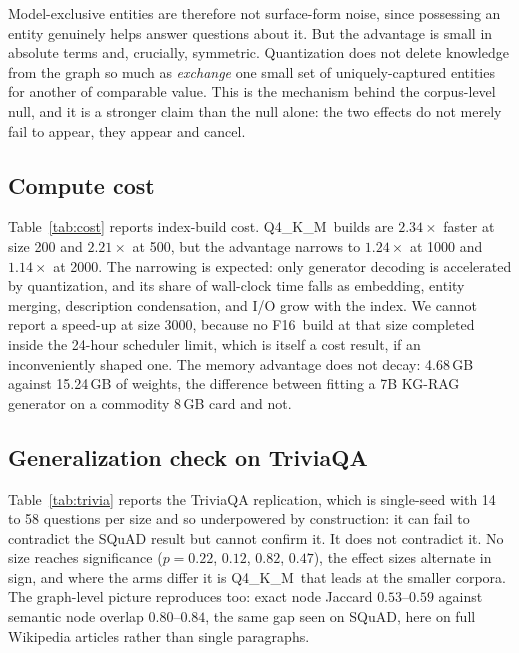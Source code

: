 \documentclass[conference, table]{IEEEtran}
\newcommand{\fsixteen}{F16}
\newcommand{\qfour}{Q4\_K\_M}
\begin{document}
\noindent
Model-exclusive entities are therefore not surface-form noise, since possessing an entity genuinely helps answer questions about it. But the advantage is small in absolute terms and, crucially, symmetric. Quantization does not delete knowledge from the graph so much as \emph{exchange} one small set of uniquely-captured entities for another of comparable value. This is the mechanism behind the corpus-level null, and it is a stronger claim than the null alone: the two effects do not merely fail to appear, they appear and cancel.



\subsection{Compute cost}

\noindent
Table~\ref{tab:cost} reports index-build cost. \qfour\ builds are $2.34\times$ faster at size 200 and $2.21\times$ at 500, but the advantage narrows to $1.24\times$ at 1000 and $1.14\times$ at 2000. The narrowing is expected: only generator decoding is accelerated by quantization, and its share of wall-clock time falls as embedding, entity merging, description condensation, and I/O grow with the index. We cannot report a speed-up at size 3000, because no \fsixteen\ build at that size completed inside the 24-hour scheduler limit, which is itself a cost result, if an inconveniently shaped one. The memory advantage does not decay: 4.68\,GB against 15.24\,GB of weights, the difference between fitting a 7B KG-RAG generator on a commodity 8\,GB card and not.



\subsection{Generalization check on TriviaQA}\label{sec:trivia}

\noindent
Table~\ref{tab:trivia} reports the TriviaQA replication, which is single-seed with 14 to 58 questions per size and so underpowered by construction: it can fail to contradict the SQuAD result but cannot confirm it. It does not contradict it. No size reaches significance ($p = 0.22$, $0.12$, $0.82$, $0.47$), the effect sizes alternate in sign, and where the arms differ it is \qfour\ that leads at the smaller corpora. The graph-level picture reproduces too: exact node Jaccard $0.53$--$0.59$ against semantic node overlap $0.80$--$0.84$, the same gap seen on SQuAD, here on full Wikipedia articles rather than single paragraphs.
\end{document}

